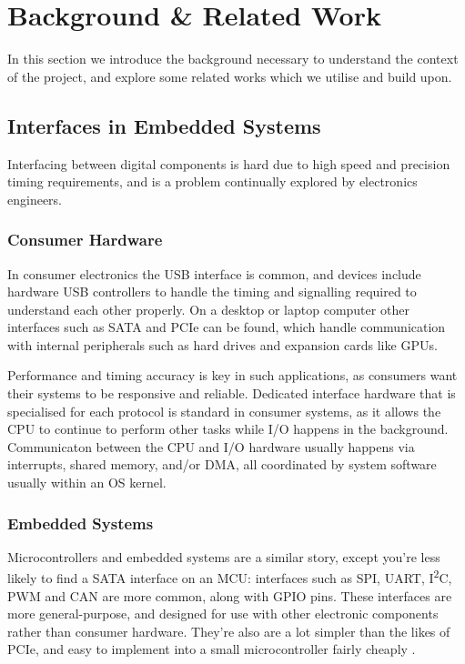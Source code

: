 \chapter{Background \& Related Work}
\label{ch:background}

In this section we introduce the background necessary to understand the context of the project, and explore some related works which we utilise and build upon.

\section{Interfaces in Embedded Systems}
\label{sec:embedded-interfaces}

Interfacing between digital components is hard due to high speed and precision timing requirements, and is a problem continually explored by electronics engineers.

\subsection{Consumer Hardware}
In consumer electronics the USB interface is common, and devices include hardware USB controllers to handle the timing and signalling required to understand each other properly. On a desktop or laptop computer other interfaces such as SATA and PCIe can be found, which handle communication with internal peripherals such as hard drives and expansion cards like GPUs.

Performance and timing accuracy is key in such applications, as consumers want their systems to be responsive and reliable. Dedicated interface hardware that is specialised for each protocol is standard in consumer systems, as it allows the CPU to continue to perform other tasks while I/O happens in the background. Communicaton between the CPU and I/O hardware usually happens via interrupts, shared memory, and/or DMA, all coordinated by system software usually within an OS kernel.

\subsection{Embedded Systems}

Microcontrollers and embedded systems are a similar story, except you're less likely to find a SATA interface on an MCU: interfaces such as SPI, UART, I\textsuperscript{2}C, PWM and CAN are more common, along with GPIO pins. These interfaces are more general-purpose, and designed for use with other electronic components rather than consumer hardware. They're also are a lot simpler than the likes of PCIe, and easy to implement into a small microcontroller fairly cheaply \cite{rp2040}.


